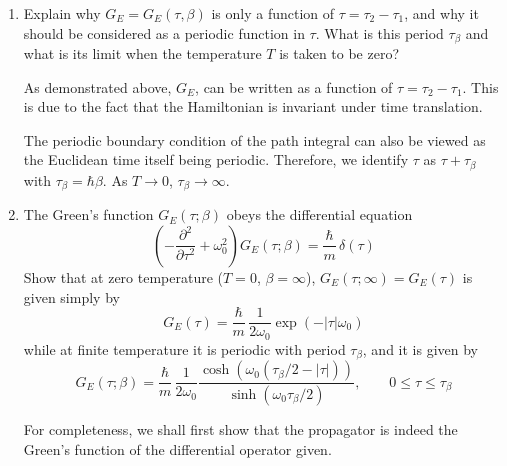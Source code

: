 \begin{enumerate}[label=\alph*)]
        \item Explain why $G_E = G_E(\tau, \beta)$ is only a function of $\tau = \tau_2 - \tau_1$, and why it should be considered as a periodic function in $\tau$. What is this period $\tau_\beta$ and what is its limit when the temperature $T$ is taken to be zero?
        \begin{solution}
            As demonstrated above, $G_E$, can be written as a function of $\tau = \tau_2-\tau_1$. This is due to the fact that the Hamiltonian is invariant under time translation. 
    
            The periodic boundary condition of the path integral can also be viewed as the Euclidean time itself being periodic. Therefore, we identify $\tau$ as $\tau + \tau_\beta$ with $\tau_\beta = \hbar \beta$. As $T\to 0$, $\tau_\beta \to \infty$.
        \end{solution}
    
        \item The Green's function $G_E(\tau; \beta)$ obeys the differential equation
        \begin{equation}
            \left(-\frac{\partial^2}{\partial\tau^2} + \omega_0^2\right) G_E(\tau;\beta) = \frac{\hbar}{m}\,\delta(\tau)
        \end{equation}
        Show that at zero temperature ($T = 0$, $\beta = \infty$), $G_E(\tau;\infty) = G_E(\tau)$ is given simply by
        \begin{equation}
            G_E(\tau) = \frac{\hbar}{m}\,\frac{1}{2\omega_0}\exp(-|\tau|\omega_0)
        \end{equation}
        while at finite temperature it is periodic with period $\tau_\beta$, and it is given by
        \begin{equation}
            G_E(\tau;\beta) = \frac{\hbar}{m}\,\frac{1}{2\omega_0}
            \frac{\cosh\!\left(\omega_0(\tau_\beta/2 - |\tau|)\right)}{\sinh\!\left(\omega_0\tau_\beta/2\right)},
            \qquad 0 \leq \tau \leq \tau_\beta
        \end{equation}
        \begin{solution}
            For completeness, we shall first show that the propagator is indeed the Green's function of the differential operator given. 
    

\end{solution}
\end{enumerate}
